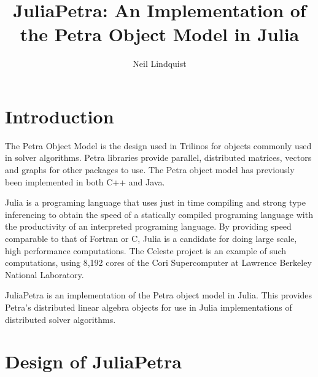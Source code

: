 \documentclass[acmsmall]{acmart}
\title{JuliaPetra: An Implementation of the Petra Object Model in Julia}
\author{Neil Lindquist}
\begin{document}
\maketitle


\section{Introduction}


The Petra Object Model is the design used in Trilinos for objects commonly used in solver algorithms.
\cite{OverviewOfTrilinos}
Petra libraries provide parallel, distributed matrices, vectors and graphs for other packages to use.
The Petra object model has previously been implemented in both C++ and Java.

Julia is a programing language that uses just in time compiling and strong type inferencing
to obtain the speed of a statically compiled programing language with the productivity of an
interpreted programing language. \cite{JuliaFreshApproach}
By providing speed comparable to that of Fortran or C, Julia is a candidate for doing large scale,
high performance computations.
The Celeste project is an example of such computations, using 8,192 cores of the Cori Supercomputer
at Lawrence Berkeley National Laboratory.

JuliaPetra is an implementation of the Petra object model in Julia.
This provides Petra's distributed linear algebra objects for use in Julia implementations
of distributed solver algorithms.

\section{Design of JuliaPetra}
\end{document}
